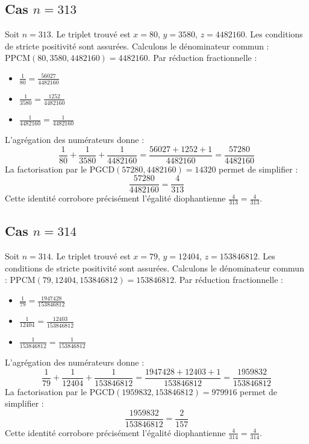 \documentclass[11pt,a4paper]{article}
\begin{document}
\subsection{Cas $n = 313$}
Soit $n = 313$. Le triplet trouvé est $x = 80$, $y = 3580$, $z = 4482160$.
Les conditions de stricte positivité sont assurées.
Calculons le dénominateur commun : $\text{PPCM}(80, 3580, 4482160) = 4482160$.
Par réduction fractionnelle :
\begin{itemize}
    \item $\frac{1}{80} = \frac{56027}{4482160}$
    \item $\frac{1}{3580} = \frac{1252}{4482160}$
    \item $\frac{1}{4482160} = \frac{1}{4482160}$
\end{itemize}
L'agrégation des numérateurs donne :
$$ \frac{1}{80} + \frac{1}{3580} + \frac{1}{4482160} = \frac{56027 + 1252 + 1}{4482160} = \frac{57280}{4482160} $$
La factorisation par le $\text{PGCD}(57280, 4482160) = 14320$ permet de simplifier :
$$ \frac{57280}{4482160} = \frac{4}{313} $$
Cette identité corrobore précisément l'égalité diophantienne $\frac{4}{313} = \frac{4}{313}$.

\subsection{Cas $n = 314$}
Soit $n = 314$. Le triplet trouvé est $x = 79$, $y = 12404$, $z = 153846812$.
Les conditions de stricte positivité sont assurées.
Calculons le dénominateur commun : $\text{PPCM}(79, 12404, 153846812) = 153846812$.
Par réduction fractionnelle :
\begin{itemize}
    \item $\frac{1}{79} = \frac{1947428}{153846812}$
    \item $\frac{1}{12404} = \frac{12403}{153846812}$
    \item $\frac{1}{153846812} = \frac{1}{153846812}$
\end{itemize}
L'agrégation des numérateurs donne :
$$ \frac{1}{79} + \frac{1}{12404} + \frac{1}{153846812} = \frac{1947428 + 12403 + 1}{153846812} = \frac{1959832}{153846812} $$
La factorisation par le $\text{PGCD}(1959832, 153846812) = 979916$ permet de simplifier :
$$ \frac{1959832}{153846812} = \frac{2}{157} $$
Cette identité corrobore précisément l'égalité diophantienne $\frac{4}{314} = \frac{4}{314}$.
\end{document}
